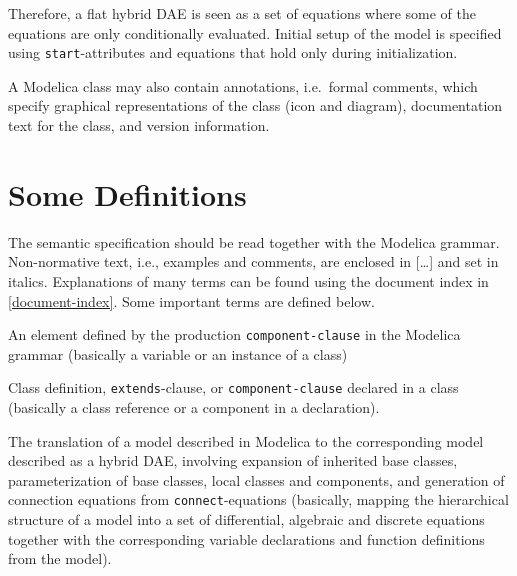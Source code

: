 Therefore, a flat hybrid DAE is seen as a set of equations where some of the equations are only conditionally evaluated.
Initial setup of the model is specified using \lstinline!start!-attributes and equations that hold only during initialization.

A Modelica class may also contain annotations, i.e.\ formal comments,
which specify graphical representations of the class (icon and diagram),
documentation text for the class, and version information.

\section{Some Definitions}\label{some-definitions}

The semantic specification should be read together with the Modelica grammar.
Non-normative text, i.e., examples and comments, are enclosed in {[}\ldots{]} and set in italics.
Explanations of many terms can be found using the document index in \cref{document-index}.
Some important terms are defined below.

\begin{definition}[Component]
An element defined by the production \lstinline[language=grammar]!component-clause! in the Modelica grammar (basically a variable or an instance of a class)
\end{definition}

\begin{definition}[Element]
Class definition, \lstinline!extends!-clause, or \lstinline[language=grammar]!component-clause! declared in a class (basically a class reference or a component in a declaration).
\end{definition}

\begin{definition}[Flattening]
The translation of a model described in Modelica to the corresponding model described as a hybrid DAE, involving expansion of inherited base classes, parameterization of base classes, local classes
and components, and generation of connection equations from \lstinline!connect!-equations (basically, mapping the hierarchical structure of a model into a set of differential, algebraic and discrete equations together with the corresponding variable declarations and function definitions from the model).
\end{definition}


